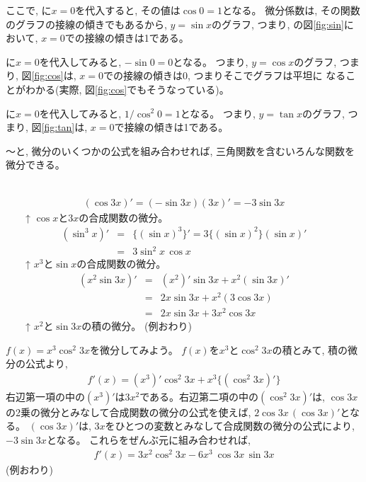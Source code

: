 ここで, に$x=0$を代入すると, その値は$\cos 0=1$となる。
微分係数は, その関数のグラフの接線の傾きでもあるから, $y=\sin x$のグラフ, 
つまり, の図\ref{fig:sin}において, $x=0$での接線の傾きは1である。

に$x=0$を代入してみると, $-\sin 0=0$となる。
つまり, $y=\cos x$のグラフ, つまり, 図\ref{fig:cos}は, 
$x=0$での接線の傾きは0, つまりそこでグラフは平坦に
なることがわかる(実際, 図\ref{fig:cos}でもそうなっている)。

に$x=0$を代入してみると, $1/\cos^2 0=1$となる。
つまり, $y=\tan x$のグラフ, つまり, 図\ref{fig:tan}は, 
$x=0$で接線の傾きは1である。\hv

〜と, 
微分のいくつかの公式を組み合わせれば, 三角関数を含むいろんな関数を微分できる。

\begin{exmpl} 
　　\begin{eqnarray}(\cos 3x)'=(-\sin 3x)(3x)'=-3\sin 3x\end{eqnarray}
　　↑ $\cos x$と$3x$の合成関数の微分。
\begin{eqnarray}(\sin^3 x)'&=&\{(\sin x)^3\}'=3\{(\sin x)^2\}(\sin x)'\nonumber\\
                             &=&3\sin^2x\,\cos x\end{eqnarray}
　　↑ $x^3$と$\sin x$の合成関数の微分。
\begin{eqnarray}(x^2\sin 3x)'&=&(x^2)'\sin 3x+x^2(\sin 3x)'\nonumber\\
                               &=&2x\sin 3x+x^2(3\cos 3x)\nonumber\\
                               &=&2x\sin 3x+3x^2 \cos 3x
\end{eqnarray}
　　↑ $x^2$と$\sin 3x$の積の微分。
(例おわり)\end{exmpl}\mv

\begin{exmpl} $f(x)=x^3\cos^2 3x$を微分してみよう。
$f(x)$を$x^3$と$\cos^2 3x$の積とみて, 積の微分の公式より, 
\begin{eqnarray*}f'(x)=(x^3)'\cos^2 3x + x^3\{(\cos^2 3x)'\}\end{eqnarray*}
右辺第一項の中の$(x^3)'$は$3x^2$である。右辺第二項の中の$(\cos^2 3x)'$は, $\cos 3x$
の2乗の微分とみなして合成関数の微分の公式を使えば, $2 \cos 3x\, (\cos 3x)'$となる。
$(\cos 3x)'$は, $3x$をひとつの変数とみなして合成関数の微分の公式により, $-3\sin 3x$となる。
これらをぜんぶ元に組み合わせれば, 
\begin{eqnarray*}f'(x)=3x^2\cos^2 3x - 6x^3\ \cos 3x\,\sin 3x\end{eqnarray*}
(例おわり)\end{exmpl}\mv

